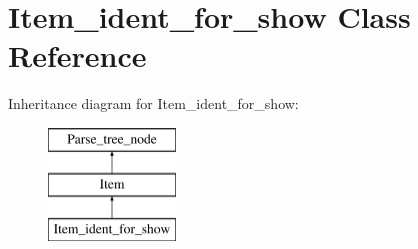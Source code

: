 \hypertarget{classItem__ident__for__show}{}\section{Item\+\_\+ident\+\_\+for\+\_\+show Class Reference}
\label{classItem__ident__for__show}
Inheritance diagram for Item\+\_\+ident\+\_\+for\+\_\+show\+:\begin{figure}[H]
\begin{center}
\leavevmode
\includegraphics[height=3.000000cm]{classItem__ident__for__show}
\end{center}
\end{figure}

